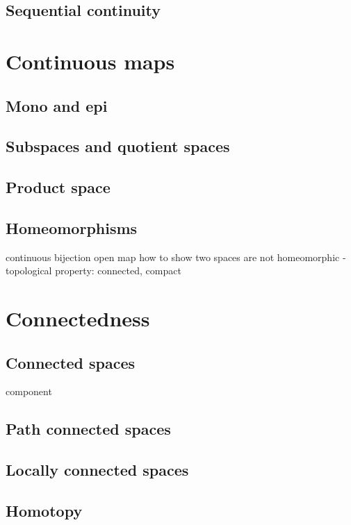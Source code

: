 \documentclass{../crs}
\begin{document}
\subsection{Sequential continuity}




\section{Continuous maps}

\subsection{Mono and epi}

\subsection{Subspaces and quotient spaces}

\subsection{Product space}

\subsection{Homeomorphisms}
continuous bijection
open map
how to show two spaces are not homeomorphic
- topological property: connected, compact


\section{Connectedness}

\subsection{Connected spaces}
component
\subsection{Path connected spaces}

\subsection{Locally connected spaces}

\subsection{Homotopy}
\end{document}
